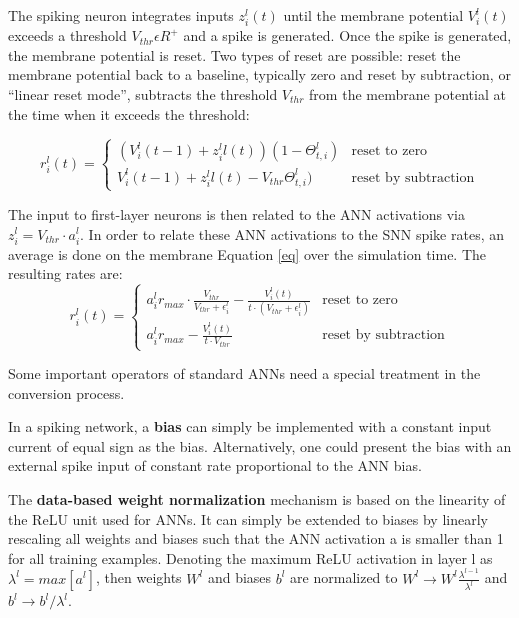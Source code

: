 \documentclass[main]{subfiles}
\begin{document}
The spiking neuron integrates inputs $z^l_i(t)$ until the membrane potential $V^l_i(t)$ exceeds a threshold $V_{thr} \epsilon R^+$ and a spike is generated. Once the spike is generated, the membrane potential
is reset. Two types of reset are possible: reset the membrane potential back to a baseline, typically zero and reset by subtraction, or “linear reset
mode”, subtracts the threshold $V_{thr}$ from the membrane potential at the time when it exceeds the threshold:

\begin{equation}\label{eq}
    r^l_i(t) = \left\{
	\begin{array}{ll}
		\left(V_i^l(t-1)+z_i^ll(t)\right)(1-\Theta_{t,i}^l)  & \mbox{reset to zero} \\
		V_i^l(t-1)+z_i^ll(t)-V_{thr}\Theta_{t,i}^l) & \mbox{reset by subtraction}
	\end{array}
\right.
\end{equation}

The input to first-layer neurons is then related to the ANN activations via $z^l_i = V_{thr}\cdot a^l_i$. In order to relate these ANN activations to the SNN spike rates, an average is done on the membrane Equation \ref{eq} over the simulation time. The resulting rates are:
\begin{equation}
    r^l_i(t) = \left\{
	\begin{array}{ll}
		a^l_i r_{max}\cdot \frac{V_{thr}}{V_{thr}+\epsilon^l_i} - \frac{V^l_i(t)}{t\cdot (V_{thr}+\epsilon_i^l)} & \mbox{reset to zero} \\
		a^l_i r_{max} - \frac{V^l_i(t)}{t\cdot V_{thr}} & \mbox{reset by subtraction}
	\end{array}
\right.
\end{equation}

Some important operators of standard ANNs need a special treatment in the conversion process. 

In a spiking network, a \textbf{bias} can simply be implemented with a constant input current of equal sign as the bias. Alternatively, one could present the bias with an external spike input of constant rate proportional to the ANN bias.

The \textbf{data-based weight normalization} mechanism is based on the linearity of the ReLU unit used for ANNs. It can simply be extended to biases by linearly rescaling all weights and biases such that the ANN activation a is smaller than 1 for all training examples. Denoting the maximum ReLU activation in layer l as $\lambda^l = max[a^l]$, then weights $W^l$ and biases $b^l$ are normalized to $W^l \rightarrow W^l\frac{\lambda^{l-1}}{\lambda^l}$ and $b^l \rightarrow b^l/\lambda^l$.
\end{document}
